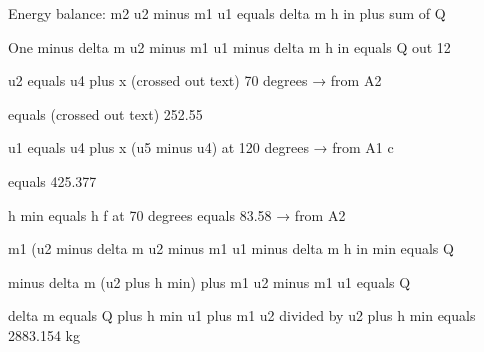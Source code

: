 Energy balance: m2 u2 minus m1 u1 equals delta m h in plus sum of Q

One minus delta m u2 minus m1 u1 minus delta m h in equals Q out 12

u2 equals u4 plus x (crossed out text) 70 degrees → from A2

equals (crossed out text) 252.55

u1 equals u4 plus x (u5 minus u4) at 120 degrees → from A1 c

equals 425.377

h min equals h f at 70 degrees equals 83.58 → from A2

m1 (u2 minus delta m u2 minus m1 u1 minus delta m h in min equals Q

minus delta m (u2 plus h min) plus m1 u2 minus m1 u1 equals Q

delta m equals Q plus h min u1 plus m1 u2 divided by u2 plus h min equals 2883.154 kg